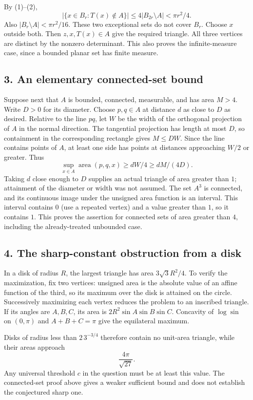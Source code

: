 By (1)--(2),
\[
 \big|\{x\in B_r:T(x)\notin A\}\big|
 \le4|B_{2r}\setminus A|<\pi r^2/4.
\]
Also $|B_r\setminus A|<\pi r^2/16$. These two exceptional sets do not
cover $B_r$. Choose $x$ outside both. Then $z,x,T(x)\in A$ give the
required triangle. All three vertices are distinct by the nonzero
determinant. This also proves the infinite-measure case, since a
bounded planar set has finite measure.

\subsection*{3. An elementary connected-set bound}
Suppose next that $A$ is bounded, connected, measurable, and has area
$M>4$. Write $D>0$ for its diameter. Choose $p,q\in A$ at distance
$d$ as close to $D$ as desired. Relative to the line $pq$, let $W$ be
the width of the orthogonal projection of $A$ in the normal direction.
The tangential projection has length at most $D$, so containment in
the corresponding rectangle gives $M\le DW$.
Since the line contains points of $A$, at least one side has points
at distances approaching $W/2$ or greater. Thus
\[
 \sup_{x\in A}\operatorname{area}(p,q,x)\ge dW/4\ge dM/(4D).
\]
Taking $d$ close enough to $D$ supplies an actual triangle of area
greater than $1$; attainment of the diameter or width was not assumed.
The set $A^3$ is connected, and its continuous image under the
unsigned area function is an interval. This interval contains $0$
(use a repeated vertex) and a value greater than $1$, so it contains
$1$. This proves the assertion for connected sets of area greater
than $4$, including the already-treated unbounded case.

\subsection*{4. The sharp-constant obstruction from a disk}
In a disk of radius $R$, the largest triangle has area
$3\sqrt3 R^2/4$. To verify the maximization, fix two vertices:
unsigned area is the absolute value of an affine function of the
third, so its maximum over the disk is attained on the circle.
Successively maximizing each vertex reduces the problem to an
inscribed triangle. If its angles are $A,B,C$, its area is
$2R^2\sin A\sin B\sin C$. Concavity of $\log\sin$ on $(0,\pi)$ and
$A+B+C=\pi$ give the equilateral maximum.

Disks of radius less than $2\,3^{-3/4}$ therefore contain no unit-area
triangle, while their areas approach
\[
 \frac{4\pi}{\sqrt{27}}.
\]
Any universal threshold $c$ in the question must be at least this value.
The connected-set proof above gives a weaker sufficient bound and does
not establish the conjectured sharp one.

